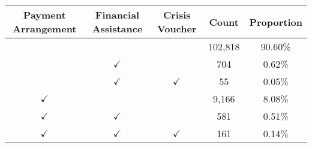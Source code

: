 \begin{tabular}{c|c|c|c|c}
\toprule 
\midrule 
Payment Arrangement & Financial Assistance & Crisis Voucher & Count & Proportion \\
\midrule 
 &  &  & 102,818 & 90.60\% \\
 & $\checkmark$ &  & 704 & 0.62\% \\
 & $\checkmark$ & $\checkmark$ & 55 & 0.05\% \\
$\checkmark$ &  &  & 9,166 & 8.08\% \\
$\checkmark$ & $\checkmark$ &  & 581 & 0.51\% \\
$\checkmark$ & $\checkmark$ & $\checkmark$ & 161 & 0.14\% \\
\midrule 
\bottomrule 
\end{tabular}

